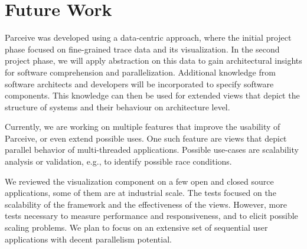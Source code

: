 \section{Future Work}
\label{sec:future_work}
Parceive was developed using a data-centric approach, where the initial project
phase focused on fine-grained trace data and its visualization. In the second
project phase, we will apply abstraction on this data to gain architectural
insights for software comprehension and parallelization. Additional knowledge
from software architects and developers will be incorporated to specify
software components. This knowledge can then be used for extended views that
depict the structure of systems and their behaviour on architecture level.

Currently, we are working on multiple features that improve the usability of
Parceive, or even extend possible uses. One such feature are views that depict
parallel behavior of multi-threaded applications. Possible use-cases are
scalability analysis or validation, e.g., to identify possible race conditions.

We reviewed the visualization component on a few open and closed source
applications, some of them are at industrial scale. The tests focused on the
scalability of the framework and the effectiveness of the views. However, more
tests necessary to measure performance and responsiveness, and to elicit
possible scaling problems. We plan to focus on an extensive set of sequential
user applications with decent parallelism potential.